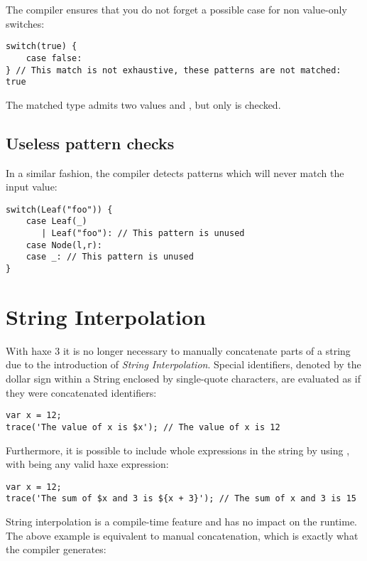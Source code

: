 \documentclass{haxe}
\begin{document}
The compiler ensures that you do not forget a possible case for non value-only switches:

\begin{lstlisting}
switch(true) {
    case false:
} // This match is not exhaustive, these patterns are not matched: true
\end{lstlisting}

The matched type  admits two values  and , but only  is checked. 


\subsection{Useless pattern checks}
\label{lf-pattern-matching-unused}

In a similar fashion, the compiler detects patterns which will never match the input value:

\begin{lstlisting}
switch(Leaf("foo")) {
    case Leaf(_)
       | Leaf("foo"): // This pattern is unused
    case Node(l,r):
    case _: // This pattern is unused
}
\end{lstlisting}



\section{String Interpolation}
\label{lf-string-interpolation}

With haxe 3 it is no longer necessary to manually concatenate parts of a string due to the introduction of \emph{String Interpolation}. Special identifiers, denoted by the dollar sign \expr{\$} within a String enclosed by single-quote  characters, are evaluated as if they were concatenated identifiers:

\begin{lstlisting}
var x = 12;
trace('The value of x is $x'); // The value of x is 12
\end{lstlisting}
Furthermore, it is possible to include whole expressions in the string by using , with  being any valid haxe expression:

\begin{lstlisting}
var x = 12;
trace('The sum of $x and 3 is ${x + 3}'); // The sum of x and 3 is 15
\end{lstlisting} 
String interpolation is a compile-time feature and has no impact on the runtime. The above example is equivalent to manual concatenation, which is exactly what the compiler generates:
\end{document}
